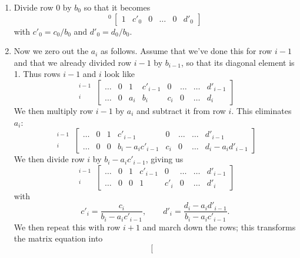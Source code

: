 \begin{enumerate}
\item Divide row 0 by $b_{0}$ so that it becomes
\[
{}^{0}\,\left[\begin{array}{ccccc|c}
  1 & c'_{0} & 0& \ldots & 0 & d'_{0} \end{array}\right]
\]
with $c'_{0} = c_{0}/b_{0}$ and $d'_{0} = d_{0}/b_{0}$.
\item Now we zero out the $a_{i}$ as follows. Assume that we've done this for row $i-1$ and that we already divided row $i-1$ by $b_{i-1}$, so that its diagonal element is 1. Thus rows $i-1$ and $i$ look like
\[
\begin{array}{r} {}^{i-1}\\ {}^{i}\end{array}\,
\left[\begin{array}{ccccccc|c}
	 \ldots & 0 & 1     & c'_{i-1} & 0     & \ldots & \ldots & d'_{i-1}\\
	 \ldots & 0 & a_{i} & b_{i}    & c_{i} & 0      & \ldots & d_{i}
\end{array}\right]
\]
We then multiply row $i-1$ by $a_{i}$ and subtract it from row $i$. This eliminates $a_{i}$:
\[
\begin{array}{r} {}^{i-1}\\ {}^{i}\end{array}\,
\left[\begin{array}{ccccccc|c}
	 \ldots & 0 & 1 & c'_{i-1}            & 0     & \ldots & \ldots & d'_{i-1}\\
	 \ldots & 0 & 0 & b_{i}-a_{i}c'_{i-1} & c_{i} & 0      & \ldots & d_{i}-a_{i}d'_{i-1}
\end{array}\right]
\]
We then divide row $i$ by $b_{i}-a_{i}c'_{i-1}$, giving us
\[
\begin{array}{r} {}^{i-1}\\ {}^{i}\end{array}\,
\left[\begin{array}{ccccccc|c}
	 \ldots & 0 & 1 & c'_{i-1} & 0      & \ldots & \ldots & d'_{i-1}\\
	 \ldots & 0 & 0 & 1        & c'_{i} & 0      & \ldots & d'_{i}
\end{array}\right]
\]
with
\[ c'_{i} = \frac{c_{i}}{b_{i}-a_{i}c'_{i-1}},\qquad d'_{i} = \frac{d_{i}-a_{i}d'_{i-1}}{b_{i}-a_{i}c'_{i-1}}.
\]
We then repeat this with row $i+1$ and march down the rows; this transforms the matrix equation into
\[
\left[\begin{array}{ccccccccccc}

\end{array}\]
\end{enumerate}
